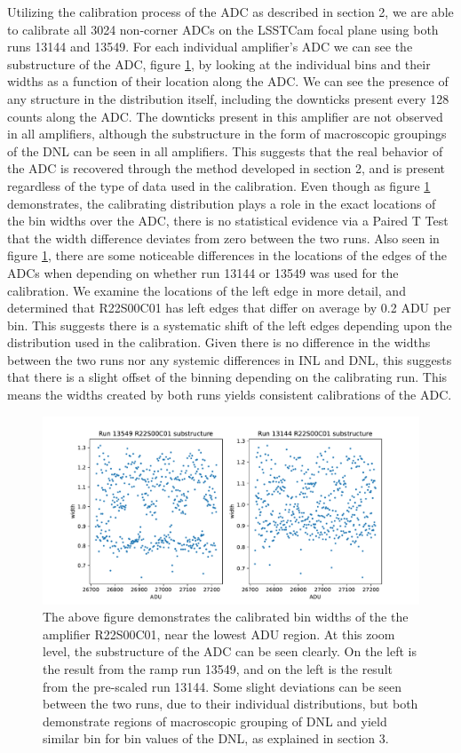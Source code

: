 \documentclass[11pt, letterpaper]{article}
\begin{document}
Utilizing the calibration process of the ADC as described in section 2, we are able to calibrate all 3024 non-corner ADCs on the LSSTCam focal plane using both runs 13144 and 13549. 
For each individual amplifier’s ADC we can see the substructure of the ADC, figure \ref{fig:substructureplot}, by looking at the individual bins and their widths as a function of their location along the ADC. 
We can see the presence of any structure in the distribution itself, including the downticks present every 128 counts along the ADC. 
The downticks present in this amplifier are not observed in all amplifiers, although the substructure in the form of macroscopic groupings of the DNL can be seen in all amplifiers.
This suggests that the real behavior of the ADC is recovered through the method developed in section 2, and is present regardless of the type of data used in the calibration.
Even though as figure \ref{fig:substructureplot} demonstrates, the calibrating distribution plays a role in the exact locations of the bin widths over the ADC, there is no statistical evidence via a Paired T Test that the width difference deviates from zero between the two runs.  
Also seen in figure \ref{fig:substructureplot}, there are some noticeable differences in the locations of the edges of the ADCs when depending on whether run 13144 or 13549 was used for the calibration.
We examine the locations of the left edge in more detail, and determined that R22S00C01 has left edges that differ on average by 0.2 ADU per bin. 
This suggests there is a systematic shift of the left edges depending upon the distribution used in the calibration.
Given there is no difference in the widths between the two runs nor any systemic differences in INL and DNL, this suggests that there is a slight offset of the binning depending on the calibrating run.
This means the widths created by both runs yields consistent calibrations of the ADC. 

\begin{figure}
    \centering
    \includegraphics[width=0.5\linewidth]{substructure.pdf}
    \caption{The above figure demonstrates the calibrated bin widths of the the amplifier R22S00C01, near the lowest ADU region. At this zoom level, the substructure of the ADC can be seen clearly. On the left is the result from the ramp run 13549, and on the left is the result from the pre-scaled run 13144.  Some slight deviations can be seen between the two runs, due to their individual distributions, but both demonstrate regions of macroscopic grouping of DNL and yield similar bin for bin values of the DNL, as explained in section 3.}
    \label{fig:substructureplot}
\end{figure}
\end{document}
